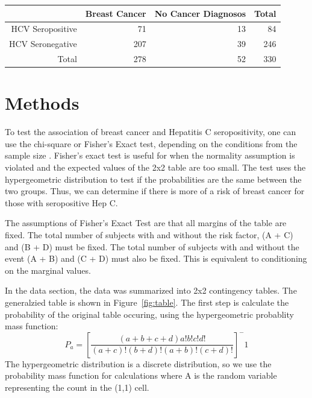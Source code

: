 \documentclass[12pt, titlepage]{article}
\begin{document}
\begin{table}[!htb]
\begin{center}
\label{tab:older}
\begin{tabular}{rrrr}
  \toprule
  & Breast Cancer & No Cancer Diagnosos & Total\\
  \midrule
  HCV Seropositive & 71 & 13 & 84 \\ 
  HCV Seronegative & 207 & 39 & 246 \\
  \midrule 
  Total & 278 & 52 & 330 \\ 
  \bottomrule
\end{tabular}
\end{center}
\end{table}

\vspace{1cm}



\section{Methods}
\label{sec:methods}

To test the association of breast cancer and Hepatitis C seropositivity, one can use
the chi-square or Fisher's Exact test, depending on the
conditions from the sample size \citep{warner2013testing}. Fisher's
exact test is useful for when the normality assumption is violated 
and the expected values of the 2x2 table are too small. The test uses 
the hypergeometric distribution to test if the probabilities are
the same between the two groups. Thus, we can determine if there is 
more of a risk of breast cancer for those with seropositive Hep C.

The assumptions of Fisher's Exact Test are that all margins of the table 
are fixed. The total number of subjects with and without the risk factor,
(A + C) and (B + D) must be fixed. The total number of subjects with and 
without the event (A + B) and (C + D) must also be fixed. This is 
equivalent to conditioning on the marginal values. 

In the data section, the data was summarized into 2x2 contingency tables.
The generalzied table is shown in Figure~\ref{fig:table}.
The first step is calculate the probability of the original table occuring,
using the hypergeometric probablity mass function:
\begin{equation}
P_a=[\frac{(a+b+c+d)a!b!c!d!}{(a+c)!(b+d)!(a+b)!(c+d)!}]^-1
\end{equation}
The hypergeometric distribution is a discrete distribution, so we use the 
probability mass function for calculations where A is the random variable 
representing the count in the (1,1) cell. 
\end{document}
